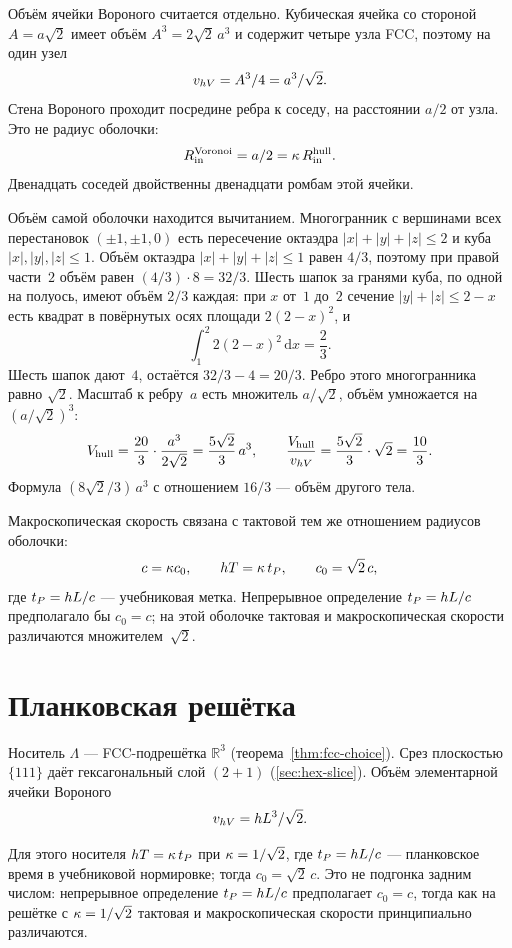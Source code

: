 Объём ячейки Вороного считается отдельно.
Кубическая ячейка со стороной $A=a\sqrt{2}$ имеет объём $A^3=2\sqrt{2}\,a^3$ и содержит четыре узла FCC, поэтому на один узел
\[
  v_{hV}=A^3/4=a^3/\sqrt{2}.
\]
Стена Вороного проходит посредине ребра к соседу, на расстоянии $a/2$ от узла.
Это не радиус оболочки:
\[
  R_{\mathrm{in}}^{\mathrm{Voronoi}}=a/2=\kappa\, R_{\mathrm{in}}^{\mathrm{hull}}.
\]
Двенадцать соседей двойственны двенадцати ромбам этой ячейки.

Объём самой оболочки находится вычитанием.
Многогранник с вершинами всех перестановок $(\pm 1,\pm 1,0)$ есть пересечение октаэдра $|x|+|y|+|z|\le 2$ и куба $|x|,|y|,|z|\le 1$.
Объём октаэдра $|x|+|y|+|z|\le 1$ равен $4/3$, поэтому при правой части~$2$ объём равен $(4/3)\cdot 8=32/3$.
Шесть шапок за гранями куба, по одной на полуось, имеют объём $2/3$ каждая: при $x$ от~$1$ до~$2$ сечение $|y|+|z|\le 2-x$ есть квадрат в повёрнутых осях площади $2(2-x)^2$, и
\[
  \int_1^2 2(2-x)^2\,\mathrm{d}x=\frac{2}{3}.
\]
Шесть шапок дают~$4$, остаётся $32/3-4=20/3$.
Ребро этого многогранника равно $\sqrt{2}$.
Масштаб к ребру~$a$ есть множитель $a/\sqrt{2}$, объём умножается на $(a/\sqrt{2})^3$:
\[
  V_{\mathrm{hull}}=\frac{20}{3}\cdot\frac{a^3}{2\sqrt{2}}=\frac{5\sqrt{2}}{3}\,a^3,
  \qquad
  \frac{V_{\mathrm{hull}}}{v_{hV}}=\frac{5\sqrt{2}}{3}\cdot\sqrt{2}=\frac{10}{3}.
\]
Формула $(8\sqrt{2}/3)\,a^3$ с отношением $16/3$ --- объём другого тела.

Макроскопическая скорость связана с тактовой тем же отношением радиусов оболочки:
\[
  c=\kappa c_0,\qquad hT=\kappa\, t_P,\qquad c_0=\sqrt{2}\,c,
\]
где $t_P=hL/c$ --- учебниковая метка.
Непрерывное определение $t_P=hL/c$ предполагало бы $c_0=c$; на этой оболочке тактовая и макроскопическая скорости различаются множителем~$\sqrt{2}$.

\section{Планковская решётка}
\label{sec:planck-lattice}

\begin{definition}
\label{def:planck-lattice}
Носитель $\Lambda$ --- FCC-подрешётка $\mathbb{R}^3$
(теорема~\ref{thm:fcc-choice}).
Срез плоскостью $\{111\}$ даёт гексагональный слой $(2{+}1)$ (\cref{sec:hex-slice}).
Объём элементарной ячейки Вороного
\[
  v_{hV}=hL^3/\sqrt{2}.
\]
\end{definition}

Для этого носителя $hT=\kappa\, t_P$ при $\kappa=1/\sqrt{2}$,
где $t_P=hL/c$ --- планковское время в учебниковой нормировке; тогда $c_0=\sqrt{2}\,c$.
Это не подгонка задним числом: непрерывное определение $t_P=hL/c$ предполагает $c_0=c$,
тогда как на решётке с $\kappa=1/\sqrt{2}$ тактовая и макроскопическая скорости
принципиально различаются.

